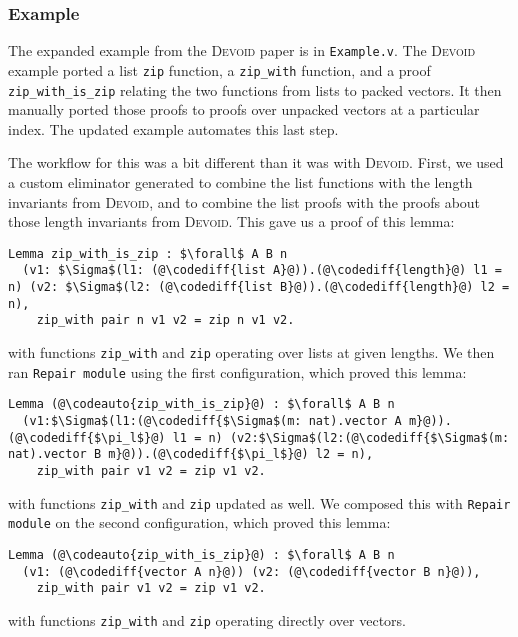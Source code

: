 
\subsubsection{Example}

The expanded example from the \textsc{Devoid} paper is in \lstinline{Example.v}.
The \textsc{Devoid} example ported a list \lstinline{zip} function,
a \lstinline{zip_with} function, and a proof \lstinline{zip_with_is_zip} relating the two
functions from lists to packed vectors.
It then manually ported those proofs to proofs over unpacked vectors at a particular index.
The updated \toolname example automates this last step.

The workflow for this was a bit different than it was with \textsc{Devoid}.
First, we used a custom eliminator \toolname generated to combine the list functions
with the length invariants from \textsc{Devoid}, and to combine the list proofs
with the proofs about those length invariants from \textsc{Devoid}.
This gave us a proof of this lemma:

\begin{lstlisting}
Lemma zip_with_is_zip : $\forall$ A B n
  (v1: $\Sigma$(l1: (@\codediff{list A}@)).(@\codediff{length}@) l1 = n) (v2: $\Sigma$(l2: (@\codediff{list B}@)).(@\codediff{length}@) l2 = n),
    zip_with pair n v1 v2 = zip n v1 v2.
\end{lstlisting}
with functions \lstinline{zip_with} and \lstinline{zip} operating over lists at given lengths.
We then ran \lstinline{Repair module} using the first
configuration, which proved this lemma:

\begin{lstlisting}
Lemma (@\codeauto{zip_with_is_zip}@) : $\forall$ A B n
  (v1:$\Sigma$(l1:(@\codediff{$\Sigma$(m: nat).vector A m}@)).(@\codediff{$\pi_l$}@) l1 = n) (v2:$\Sigma$(l2:(@\codediff{$\Sigma$(m: nat).vector B m}@)).(@\codediff{$\pi_l$}@) l2 = n),
    zip_with pair v1 v2 = zip v1 v2.
\end{lstlisting}
with functions \lstinline{zip_with} and \lstinline{zip} updated as well.
We composed this with \lstinline{Repair module} on the second configuration,
which proved this lemma:

\begin{lstlisting}
Lemma (@\codeauto{zip_with_is_zip}@) : $\forall$ A B n
  (v1: (@\codediff{vector A n}@)) (v2: (@\codediff{vector B n}@)),
    zip_with pair v1 v2 = zip v1 v2.
\end{lstlisting}
with functions \lstinline{zip_with} and \lstinline{zip} operating directly over vectors.

